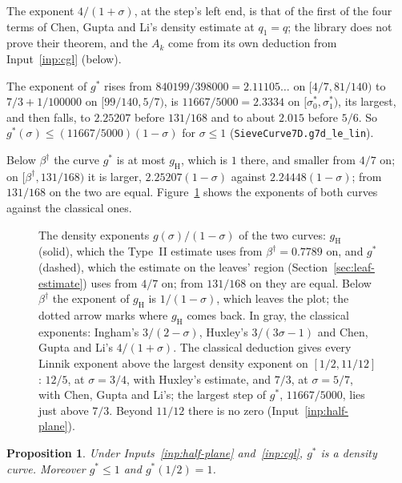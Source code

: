\documentclass[11pt]{article}
\newtheorem{proposition}[theorem]{Proposition}
\theoremstyle{definition}
\newcommand{\lean}[1]{\texttt{#1}}
\begin{document}
The exponent $4/(1 + \sigma)$, at the step's left end, is that of the first of the four terms of Chen, Gupta and Li's
density estimate \cite[Theorem~1.2]{cgl} at $q_1 = q$; the library does not prove their theorem, and the $A_k$ come
from its own deduction from Input~\ref{inp:cgl} (below).

The exponent of $g^*$ rises from $840199/398000 = 2.11105\ldots$ on $[4/7, 81/140)$ to $7/3 + 1/100000$ on
$[99/140, 5/7)$, is $11667/5000 = 2.3334$ on $[\sigma^*_0, \sigma^*_1)$, its largest, and then falls, to $2.25207$
before $131/168$ and to about $2.015$ before $5/6$. So $g^*(\sigma) \le (11667/5000)(1 - \sigma)$ for $\sigma \le 1$
(\lean{SieveCurve7D.g7d\_le\_lin}).

Below $\beta^\dagger$ the curve $g^*$ is
at most $g_{\mathrm H}$, which is $1$ there, and smaller from $4/7$ on; on $[\beta^\dagger, 131/168)$ it is larger,
$2.25207(1 - \sigma)$ against $2.24448(1 - \sigma)$; from $131/168$ on the two are equal. Figure~\ref{fig:density}
shows the
exponents of both curves against the classical ones.

\begin{figure}[t]
\centering

\caption{The density exponents $g(\sigma)/(1 - \sigma)$ of the two curves: $g_{\mathrm H}$ (solid), which the
Type~II estimate uses from $\beta^\dagger = 0.7789$ on, and $g^*$ (dashed), which the estimate on the leaves' region
(Section~\ref{sec:leaf-estimate}) uses from $4/7$ on; from $131/168$ on they are equal. Below $\beta^\dagger$ the
exponent of $g_{\mathrm H}$ is $1/(1 - \sigma)$,
which leaves the plot; the dotted arrow marks where $g_{\mathrm H}$ comes back. In gray, the classical exponents:
Ingham's $3/(2 - \sigma)$, Huxley's $3/(3\sigma - 1)$ and Chen, Gupta and Li's $4/(1 + \sigma)$. The classical
deduction gives every Linnik exponent above the largest density exponent on $[1/2, 11/12]$: $12/5$, at $\sigma =
3/4$, with Huxley's estimate, and $7/3$, at $\sigma = 5/7$, with Chen, Gupta and Li's; the largest step of $g^*$,
$11667/5000$, lies just above $7/3$. Beyond $11/12$ there is no zero (Input~\ref{inp:half-plane}).}
\label{fig:density}
\end{figure}

\begin{proposition}\label{prop:curve-star}
Under Inputs~\ref{inp:half-plane} and~\ref{inp:cgl}, $g^*$ is a density curve. Moreover $g^* \le 1$ and
$g^*(1/2) = 1$.
\end{proposition}
\end{document}
